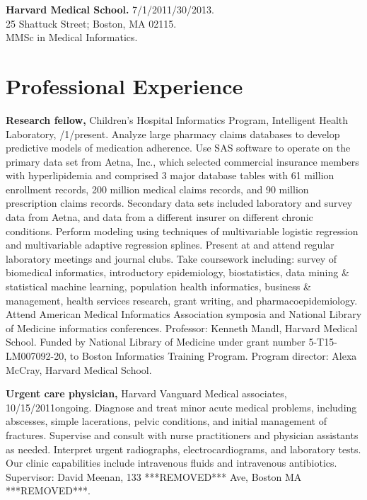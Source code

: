 \documentclass[12pt]{article}
\begin{document}
\textbf{Harvard Medical School.} 7/1/2011/30/2013.\\
25 Shattuck Street; Boston, MA 02115.\\
MMSc in Medical Informatics.

\newpage

\section*{Professional Experience}

\textbf{Research fellow,} Children’s Hospital Informatics Program,
Intelligent Health Lab\-o\-ra\-to\-ry,
/1/\ndash{}\linebreak[0]pres\-ent. Analyze large
pharmacy claims databases to develop predictive models of medication
adherence. Use SAS software to operate on the primary data set from
Aetna, Inc., which selected commercial insurance members with
hyperlipidemia and comprised 3 major database tables with 61 million
enrollment records, 200 million medical claims records, and 90 million
prescription claims records. Secondary data sets included laboratory
and survey data from Aetna, and data from a different insurer on
different chronic conditions. Perform modeling using techniques of
multivariable logistic regression and multivariable adaptive
regression splines. Present at and attend regular laboratory meetings
and journal clubs. Take coursework including: survey of biomedical
informatics, introductory epidemiology, biostatistics, data mining \&
statistical machine learning, population health informatics, business
\& management, health services research, grant writing, and
pharmacoepidemiology. Attend American Medical Informatics Association
symposia and National Library of Medicine informatics conferences.
Professor: Kenneth Mandl, Harvard Medical School. Funded by National
Library of Medicine under grant number 5-T15-LM007092-20, to Boston
Informatics Training Program. Program director: Alexa McCray, Harvard
Medical School.

\textbf{Urgent care physician,} Harvard Vanguard Medical associates,
10/15/2011\ndash{}ongoing. Diagnose and treat minor acute medical problems,
including abscesses, simple lacerations, pelvic conditions, and
initial management of fractures. Supervise and consult with nurse
practitioners and physician assistants as needed. Interpret urgent
radiographs, electrocardiograms, and laboratory tests. Our clinic
capabilities include intravenous fluids and intravenous antibiotics.
Supervisor: David Meenan, 133 ***REMOVED*** Ave, Boston MA ***REMOVED***.
\end{document}
